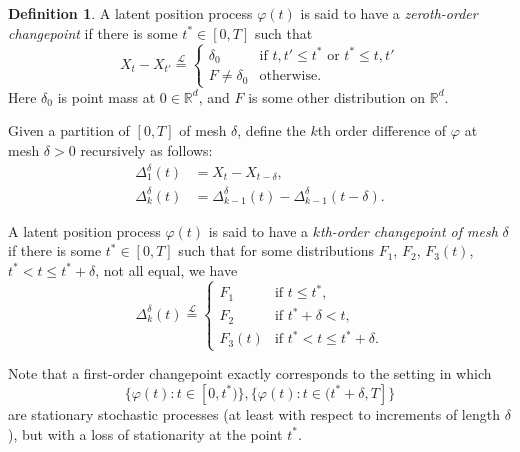 \documentclass[12pt]{article}
\newcommand{\RR}{\mathbb{R}}
\theoremstyle{definition}
\newtheorem{definition}{Definition}
\begin{document}
\begin{definition}
\label{def:highchangepoints}
A latent position process $\varphi(t)$ is said to have a \emph{zeroth-order changepoint} if there is some $t^*\in[0,T]$ such that
$$ X_t - X_{t'} \overset{\mathcal{L}}{=} \begin{cases}\delta_0 &\text{if }t,t'\leq t^*\text{ or }t^*\leq t,t'\\ F \neq \delta_0&\text{otherwise.}\end{cases}$$
Here $\delta_0$ is point mass at $0\in\RR^d$, and $F$ is some other distribution on $\RR^d$.

Given a partition of $[0,T]$ of mesh $\delta$, define the $k$th order difference of $\varphi$ at mesh $\delta>0$ recursively as follows: 
\begin{align*}
\Delta_1^\delta(t) &= X_t - X_{t-\delta},\\ 
\Delta_k^\delta(t) &= \Delta_{k-1}^\delta(t)-\Delta_{k-1}^\delta(t-\delta).
\end{align*}

A latent position process $\varphi(t)$ is said to have a \emph{$k$th-order changepoint of mesh }$\delta$ if there is some $t^*\in[0,T]$ such that for some distributions $F_1$, $F_2$, $F_3(t)$, $t^{*}<t\leq t^{*}+\delta$, not all equal, we have 
$$ \Delta_{k}^\delta(t) \overset{\mathcal{L}}{=} \begin{cases} F_1 &\text{if }t\leq t^*,\\
F_2&\text{if }t^*+\delta<  t,\\ F_3(t)&\text{if }t^*< t\leq t^*+\delta.\end{cases}$$ 
\end{definition}

Note that a first-order changepoint exactly corresponds to the setting in which 
$$\{\varphi(t): t\in [0,t^*)\}, \{\varphi(t): t\in(t^*+\delta,T]\}$$ are stationary stochastic processes (at least with respect to increments of length $\delta$), but with a loss of stationarity at the point $t^*$.
\end{document}
